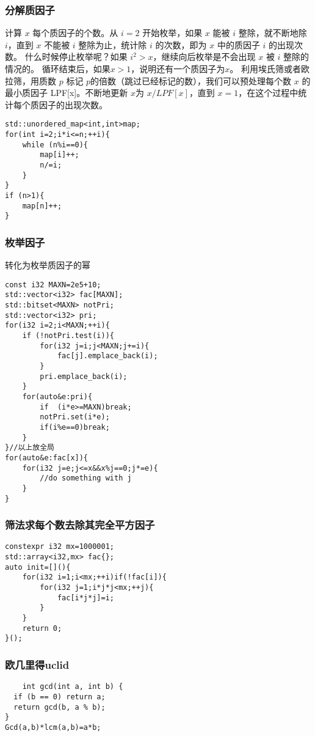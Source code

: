 \documentclass[UTF8]{ctexart}
\begin{document}
\subsubsection{分解质因子}
计算 $x$ 每个质因子的个数。从 $i=2$ 开始枚举，如果 $x$ 能被 $i$ 整除，就不断地除 $i$，直到 $x$ 不能被 $i$ 整除为止，统计除 $i$ 的次数，即为 $x$ 中的质因子 $i$ 的出现次数。
什么时候停止枚举呢？如果 $i ^2>x$，继续向后枚举是不会出现 $x$ 被 $i$ 整除的情况的。
循环结束后，如果$ x>1$，说明还有一个质因子为$ x$。
利用埃氏筛或者欧拉筛，用质数 $p$ 标记 $p$的倍数（跳过已经标记的数），我们可以预处理每个数 $x$ 的最小质因子 LPF[x]。不断地更新 $x $为  $x/LPF[x] $，直到 $x=1$，在这个过程中统计每个质因子的出现次数。
\begin{lstlisting}
std::unordered_map<int,int>map;
for(int i=2;i*i<=n;++i){
    while (n%i==0){
        map[i]++;
        n/=i;
    }
}
if (n>1){
    map[n]++;
}
\end{lstlisting}
\subsubsection{枚举因子}
转化为枚举质因子的幂
\begin{lstlisting}
const i32 MAXN=2e5+10;
std::vector<i32> fac[MAXN];
std::bitset<MAXN> notPri;
std::vector<i32> pri;
for(i32 i=2;i<MAXN;++i){
    if (!notPri.test(i)){
        for(i32 j=i;j<MAXN;j+=i){
            fac[j].emplace_back(i);
        }
        pri.emplace_back(i);
    }
    for(auto&e:pri){
        if  (i*e>=MAXN)break;
        notPri.set(i*e);
        if(i%e==0)break;
    }
}//以上放全局
for(auto&e:fac[x]){
    for(i32 j=e;j<=x&&x%j==0;j*=e){
        //do something with j
    }
}
\end{lstlisting}
\subsubsection{筛法求每个数去除其完全平方因子}
\begin{lstlisting}
constexpr i32 mx=1000001;
std::array<i32,mx> fac{};
auto init=[](){
    for(i32 i=1;i<mx;++i)if(!fac[i]){
        for(i32 j=1;i*j*j<mx;++j){
            fac[i*j*j]=i;
        }
    }
    return 0;
}();
\end{lstlisting}
\subsubsection{欧几里得uclid}
\begin{lstlisting}
    int gcd(int a, int b) {
  if (b == 0) return a;
  return gcd(b, a % b);
}
Gcd(a,b)*lcm(a,b)=a*b;
\end{lstlisting}
\end{document}
